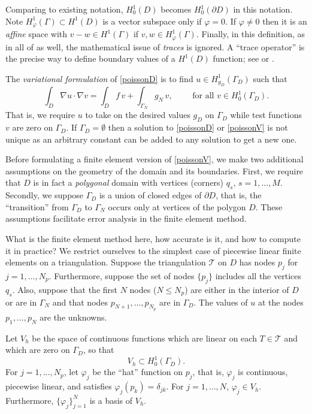 \documentclass[12pt]{amsart}
\theoremstyle{definition}
\newcommand{\grad}{\nabla}
\newcommand{\vf}{\varphi}
\begin{document}
Comparing to existing notation, $H_0^1(D)$ becomes $H_0^1(\partial D)$ in this notation.  Note $H_\vf^1(\Gamma)\subset H^1(D)$ is a vector subspace only if $\vf=0$.  If $\vf\ne 0$ then it is an \emph{affine} space with $v-w\in H^1(\Gamma)$ if $v,w \in H_\vf^1(\Gamma)$.  Finally, in this definition, as in all of \cite{Johnson} as well, the mathematical issue of \emph{traces} is ignored.  A ``trace operator'' is the precise way to define boundary values of a $H^1(D)$ function; see \cite[section 5.5] {Evans} or \cite[section 1.6]{BrennerScott}.

The \emph{variational formulation} of \eqref{poissonD} is to find $u\in H_{g_D}^1(\Gamma_D)$ such that
\begin{equation}\label{poissonV}  
\int_D \grad u\cdot \grad v = \int_D f \,v + \int_{\Gamma_N} g_N \,v, \qquad \text{ for all } v\in H_0^1(\Gamma_D).
\end{equation}
That is, we require $u$ to take on the desired values $g_D$ on $\Gamma_D$ while test functions $v$ are zero on $\Gamma_D$.  If $\Gamma_D=\emptyset$ then a solution to \eqref{poissonD} or \eqref{poissonV} is not unique as an arbitrary constant can be added to any solution to get a new one.

Before formulating a finite element version of \eqref{poissonV}, we make two additional assumptions on the geometry of the domain and its boundaries.  First, we require that $D$ is in fact a \emph{polygonal} domain with vertices (corners) $q_s$, $s=1,\dots,M$.  Secondly, we suppose $\Gamma_D$ is a union of closed edges of $\partial D$, that is, the ``transition'' from $\Gamma_D$ to $\Gamma_N$ occurs only at vertices of the polygon $D$.  These assumptions facilitate error analysis in the finite element method.

What is the finite element method here, how accurate is it, and how to compute it in practice?  We restrict ourselves to the simplest case of piecewise linear finite elements on a triangulation.  Suppose the triangulation $\mathcal{T}$ on $D$ has nodes $p_j$ for $j=1,\dots,N_p$.  Furthermore, suppose the set of nodes $\{p_j\}$ includes all the vertices $q_s$.   Also, suppose that the first $N$ nodes ($N\le N_p$) are either in the interior of $D$ or are in $\Gamma_N$ and that nodes $p_{N+1},\dots,p_{N_p}$ are in $\Gamma_D$.  The values of $u$ at the nodes $p_1,\dots,p_N$ are the unknowns.

Let $V_h$ be the space of continuous functions which are linear on each $T\in\mathcal{T}$ and which are zero on $\Gamma_D$, so that
    $$V_h \subset H_0^1(\Gamma_D).$$
For $j=1,\dots,N_p$, let $\vf_j$ be the ``hat'' function on $p_j$, that is, $\vf_j$ is continuous, piecewise linear, and satisfies $\vf_j(p_k)=\delta_{jk}$.  For $j=1,\dots,N$, $\vf_j\in V_h$.  Furthermore, $\{\vf_j\}_{j=1}^N$ is a basis of $V_h$.
\end{document}
